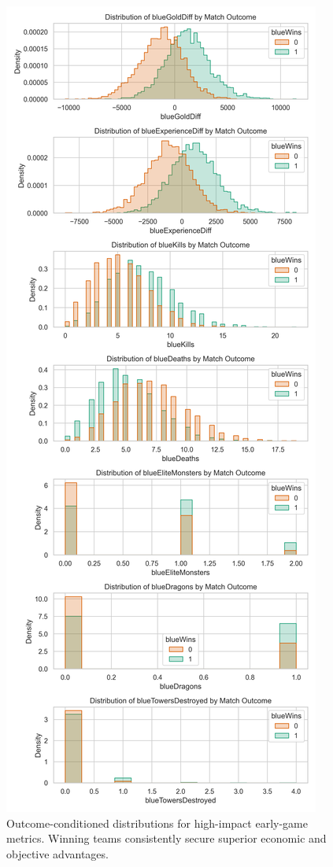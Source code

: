 \documentclass[aps,prl,preprint,groupedaddress]{revtex4-2}
\begin{document}
\begin{figure}[H]
    \centering
    \includegraphics[width=0.72\linewidth]{figures/eda/feature_distributions.png}
    \caption{Outcome-conditioned distributions for high-impact early-game metrics. Winning teams consistently secure superior economic and objective advantages.}
    \label{fig:distros}
\end{figure}
\end{document}
